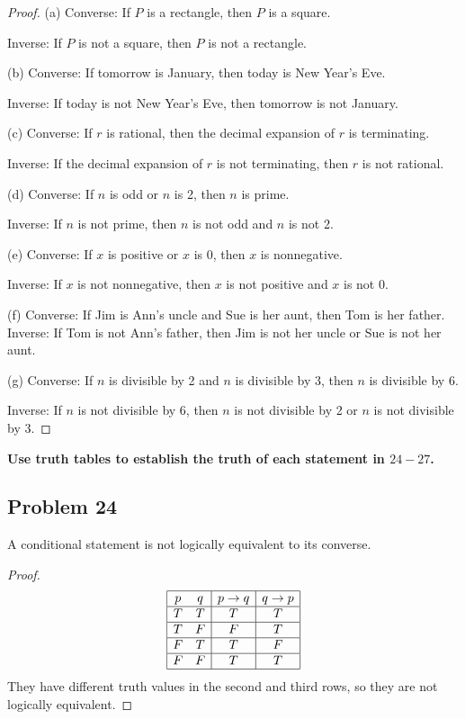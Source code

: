 \documentclass[14pt]{extarticle}
\begin{document}
\begin{proof}
(a) Converse: If $P$ is a rectangle, then $P$ is a square.

Inverse: If $P$ is not a square, then $P$ is not a rectangle.

(b) Converse: If tomorrow is January, then today is New Year’s Eve.

Inverse: If today is not New Year’s Eve, then tomorrow is not January.

(c) Converse: If $r$ is rational, then the decimal expansion of $r$ is
terminating.

Inverse: If the decimal expansion of $r$ is not terminating, then $r$ is not
rational.

(d) Converse: If $n$ is odd or $n$ is 2, then $n$ is prime.

Inverse: If $n$ is not prime, then $n$ is not odd and $n$ is not 2.	

(e) Converse: If $x$ is positive or $x$ is 0, then $x$ is nonnegative.

Inverse: If $x$ is not nonnegative, then $x$ is not positive and $x$ is not 0.

(f) Converse: If Jim is Ann’s uncle and Sue is her aunt, then Tom is her father.
Inverse: If Tom is not Ann’s father, then Jim is not her uncle or Sue is not her
aunt.

(g) Converse: If $n$ is divisible by 2 and $n$ is divisible by 3, then $n$ is
divisible by 6.

Inverse: If $n$ is not divisible by 6, then $n$ is not divisible by 2 or $n$ is
not divisible by 3.
\end{proof}

{\bf Use truth tables to establish the truth of each statement
in $24-27$.}

\subsection{Problem 24}
A conditional statement is not logically equivalent to its converse.

\begin{proof}
$$
\begin{array}{|cc|c|c|}
\hline
p & q & p \to q & q \to p \\
\hline
T & T & T & T \\
\hline
T & F & F & T \\
\hline
F & T & T & F \\
\hline
F & F & T & T \\
\hline
\end{array}
$$
They have different truth values in the second and third rows, so they are not
logically equivalent.
\end{proof}
\end{document}
